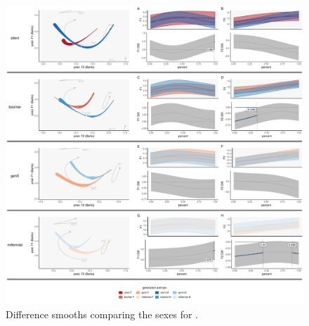 \begin{figure}[p]
    \centering
    \includegraphics[width=\textwidth]{Figures/BING/BING_sex_panel_plot.pdf}
    \caption{Difference smooths comparing the sexes for \bing.}
    \label{fig:bing_diff_smooths_sex_gen}
\end{figure}




